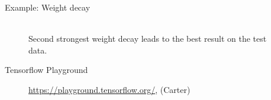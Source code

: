\begin{vbframe}{Example: Weight decay}
\framebreak

\begin{figure}
\centering
{}
\\
Second strongest weight decay leads to the best result on the test data.
\end{figure}
\end{vbframe}
  
\begin{frame}{Tensorflow Playground}
\begin{figure}
\centering
{}
  \caption{\url{https://playground.tensorflow.org/}, (Carter)}
  \end{figure}
\end{frame}

